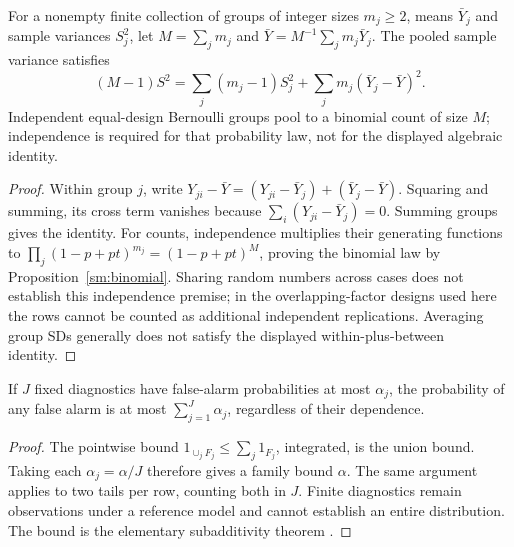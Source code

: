 \begin{proposition}
\label{sm:pooling}
For a nonempty finite collection of groups of integer sizes \(m_j\geq2\),
means \(\bar Y_j\) and sample variances
\(S_j^2\), let \(M=\sum_jm_j\) and
\(\bar Y=M^{-1}\sum_jm_j\bar Y_j\). The pooled sample variance satisfies
\[
 (M-1)S^2=\sum_j(m_j-1)S_j^2+\sum_jm_j(\bar Y_j-\bar Y)^2.
\]
Independent equal-design Bernoulli groups pool to a binomial count of size
\(M\); independence is required for that probability law, not for the
displayed algebraic identity.
\end{proposition}
\begin{proof}
Within group \(j\), write
\(Y_{ji}-\bar Y=(Y_{ji}-\bar Y_j)+(\bar Y_j-\bar Y)\).
Squaring and summing, its cross term vanishes because
\(\sum_i(Y_{ji}-\bar Y_j)=0\). Summing groups gives the identity.
For counts, independence multiplies their generating functions to
\(\prod_j(1-p+pt)^{m_j}=(1-p+pt)^M\), proving the binomial law by
Proposition~\ref{sm:binomial}. Sharing random numbers across cases does not
establish this independence premise; in the overlapping-factor designs used
here the rows cannot be counted as additional independent replications.
Averaging group SDs generally does
not satisfy the displayed within-plus-between identity.
\end{proof}

\begin{proposition}
\label{sm:multiple}
If \(J\) fixed diagnostics have false-alarm probabilities at most
\(\alpha_j\), the probability of any false alarm is at most
\(\sum_{j=1}^J\alpha_j\), regardless of their dependence.
\end{proposition}
\begin{proof}
The pointwise bound \(1_{\cup_j F_j}\leq\sum_j1_{F_j}\), integrated,
is the union bound. Taking each \(\alpha_j=\alpha/J\) therefore gives
a family bound \(\alpha\). The same argument applies to two tails per
row, counting both in \(J\). Finite diagnostics remain observations
under a reference model and cannot establish an entire distribution.
The bound is the elementary subadditivity theorem
\citep[Section 1.1]{durrett2019}.
\end{proof}

